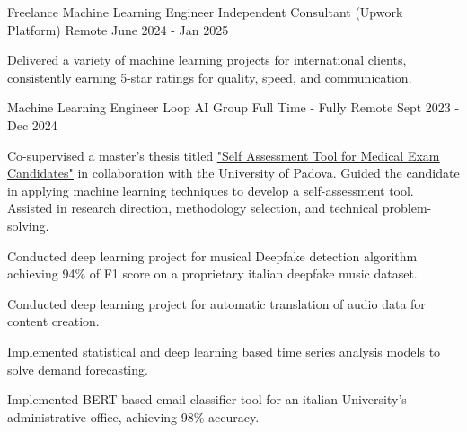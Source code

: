 

\begin{cventries}

    \cventry
    {Freelance Machine Learning Engineer} %
    {Independent Consultant (Upwork Platform)} %
    {Remote} %
    {June 2024 - Jan 2025} %
    {
      \begin{cvitems} %
        \item {Delivered a variety of machine learning projects for international clients, consistently earning 5-star ratings for quality, speed, and communication.}
      \end{cvitems}
    }

    
    \cventry
    {Machine Learning Engineer} %
    {Loop AI Group} %
    {Full Time - Fully Remote} %
    {Sept 2023 - Dec 2024} %
    {
      \begin{cvitems} %
        \item {
        Co-supervised a master's thesis titled \href{https://thesis.unipd.it/handle/20.500.12608/70905}{\underline{"Self Assessment Tool for Medical Exam Candidates"}} in collaboration with the University of Padova.
Guided the candidate in applying machine learning techniques to develop a self-assessment tool.
Assisted in research direction, methodology selection, and technical problem-solving.
        }
        \item {Conducted deep learning project for musical Deepfake detection algorithm achieving 94\% of F1 score on a proprietary italian deepfake music dataset.}
        \item {Conducted deep learning project for automatic translation of audio data for content creation.}
        \item {Implemented statistical and deep learning based time series analysis models to solve demand forecasting.}
        \item {Implemented BERT-based email classifier tool for an italian University's administrative office, achieving 98\% accuracy.}
      \end{cvitems}
    }


\end{cventries}
